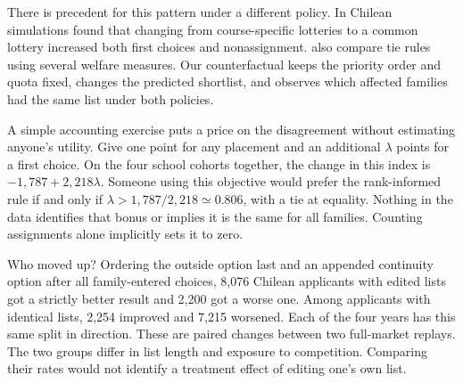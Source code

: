 There is precedent for this pattern under a different policy. In Chilean simulations \citet[Table~6]{correaschool} found that changing from course-specific lotteries to a common lottery increased both first choices and nonassignment. \citet{trace2026} also compare tie rules using several welfare measures. Our counterfactual keeps the priority order and quota fixed, changes the predicted shortlist, and observes which affected families had the same list under both policies.

A simple accounting exercise puts a price on the disagreement without estimating anyone's utility. Give one point for any placement and an additional $\lambda$ points for a first choice. On the four school cohorts together, the change in this index is $-1{,}787+2{,}218\lambda$. Someone using this objective would prefer the rank-informed rule if and only if $\lambda>1{,}787/2{,}218\simeq0.806$, with a tie at equality. Nothing in the data identifies that bonus or implies it is the same for all families. Counting assignments alone implicitly sets it to zero.

Who moved up? Ordering the outside option last and an appended continuity option after all family-entered choices, 8,076 Chilean applicants with edited lists got a strictly better result and 2,200 got a worse one. Among applicants with identical lists, 2,254 improved and 7,215 worsened. Each of the four years has this same split in direction. These are paired changes between two full-market replays. The two groups differ in list length and exposure to competition. Comparing their rates would not identify a treatment effect of editing one's own list.
